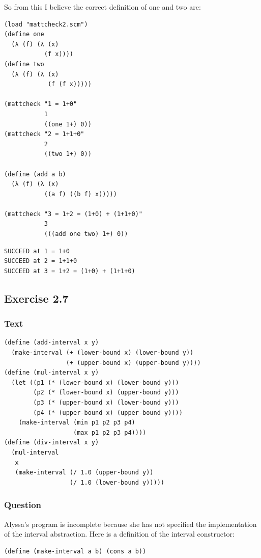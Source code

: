 \documentclass[final,fleqn,titlepage]{article}
\begin{document}
So from this I believe the correct definition of one and two are:
\begin{verbatim}
(load "mattcheck2.scm")
(define one
  (λ (f) (λ (x)
           (f x))))
(define two
  (λ (f) (λ (x)
            (f (f x)))))

(mattcheck "1 = 1+0"
           1
           ((one 1+) 0))
(mattcheck "2 = 1+1+0"
           2
           ((two 1+) 0))

(define (add a b)
  (λ (f) (λ (x)
           ((a f) ((b f) x)))))

(mattcheck "3 = 1+2 = (1+0) + (1+1+0)"
           3
           (((add one two) 1+) 0))
\end{verbatim}

\begin{verbatim}
SUCCEED at 1 = 1+0
SUCCEED at 2 = 1+1+0
SUCCEED at 3 = 1+2 = (1+0) + (1+1+0)
\end{verbatim}

\subsection{Exercise 2.7}
\label{sec:orge341e5d}
\subsubsection{Text}
\label{sec:org69ca336}
\begin{verbatim}
(define (add-interval x y)
  (make-interval (+ (lower-bound x) (lower-bound y))
                 (+ (upper-bound x) (upper-bound y))))
(define (mul-interval x y)
  (let ((p1 (* (lower-bound x) (lower-bound y)))
        (p2 (* (lower-bound x) (upper-bound y)))
        (p3 (* (upper-bound x) (lower-bound y)))
        (p4 (* (upper-bound x) (upper-bound y))))
    (make-interval (min p1 p2 p3 p4)
                   (max p1 p2 p3 p4))))
(define (div-interval x y)
  (mul-interval
   x
   (make-interval (/ 1.0 (upper-bound y))
                  (/ 1.0 (lower-bound y)))))
\end{verbatim}
\subsubsection{Question}
\label{sec:orge87732e}
Alyssa's program is incomplete because she has not specified the implementation
of the interval abstraction. Here is a definition of the interval constructor:

\begin{verbatim}
(define (make-interval a b) (cons a b))
\end{verbatim}
\end{document}
